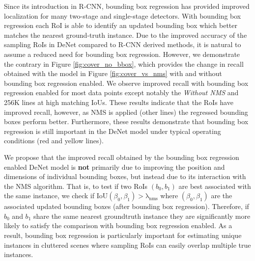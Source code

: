 \documentclass[10pt,twocolumn,letterpaper]{article}
\begin{document}
Since its introduction in R-CNN\cite{rcnn}, bounding box regression has provided improved localization for many two-stage\cite{faster-rcnn}\cite{fpn}\cite{deform-rfcn}\cite{denet} and single-stage detectors\cite{retinanet}\cite{ssd}\cite{yolo}. With bounding box regression each RoI is able to identify an updated bounding box which better matches the nearest ground-truth instance. Due to the improved accuracy of the sampling RoIs in DeNet compared to R-CNN derived methods, it is natural to assume a reduced need for bounding box regression. However, we demonstrate the contrary in Figure \ref{fig:cover_no_bbox}, which provides the change in recall obtained with the model in Figure \ref{fig:cover_vs_nms} with and without bounding box regression enabled. We observe improved recall with bounding box regression enabled for most data points except notably the \textit{Without NMS} and 256K lines at high matching IoUs. These results indicate that the RoIs have improved recall, however, as NMS is applied (other lines) the regressed bounding boxes perform better. Furthermore, these results demonstrate that bounding box regression is still important in the DeNet model under typical operating conditions (red and yellow lines). 

We propose that the improved recall obtained by the bounding box regression enabled DeNet model is \textbf{not} primarily due to improving the position and dimensions of individual bounding boxes, but instead due to its interaction with the NMS algorithm. That is, to test if two RoIs $(b_0,b_1)$ are best associated with the same instance, we check if $\mathrm{IoU}(\beta_0,\beta_1) > \bm{\mathrm{\lambda_{nms}}}$ where $(\beta_0,\beta_1)$ are the associated updated bounding boxes (after bounding box regression). Therefore, if $b_0$ and $b_1$ share the same nearest groundtruth instance they are significantly more likely to satisfy the comparison with bounding box regression enabled. As a result, bounding box regression is particularly important for estimating unique instances in cluttered scenes where sampling RoIs can easily overlap multiple true instances. 
\end{document}
